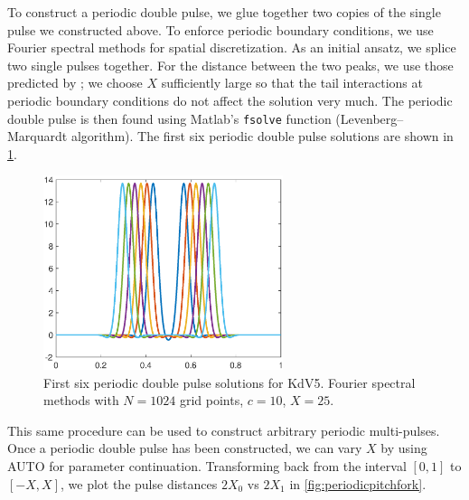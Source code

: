 \documentclass[11pt,reqno]{amsart}
\theoremstyle{plain}
\theoremstyle{definition}
\theoremstyle{remark}
\begin{document}
To construct a periodic double pulse, we glue together two copies of the single pulse we constructed above. To enforce periodic boundary conditions, we use Fourier spectral methods for spatial discretization. As an initial ansatz, we splice two single pulses together. For the distance between the two peaks, we use those predicted by \cite{SandstedeStrut}; we choose $X$ sufficiently large so that the tail interactions at periodic boundary conditions do not affect the solution very much. The periodic double pulse is then found using Matlab's \texttt{fsolve} function (Levenberg–Marquardt algorithm). The first six periodic double pulse solutions are shown in \cref{fig:KdV5doublepulse}.
\begin{figure}
\begin{center}
\includegraphics[width=7cm]{images/double10.eps}
\caption[Double pulse solutions for KdV5]{First six periodic double pulse solutions for KdV5. Fourier spectral methods with $N = 1024$ grid points, $c = 10$, $X = 25$.}
\label{fig:KdV5doublepulse}
\end{center}
\end{figure}
This same procedure can be used to construct arbitrary periodic multi-pulses. Once a periodic double pulse has been constructed, we can vary $X$ by using AUTO for parameter continuation. Transforming back from the interval $[0, 1]$ to $[-X, X]$, we plot the pulse distances $2 X_0$ vs $2 X_1$ in \cref{fig:periodicpitchfork}.
\end{document}
